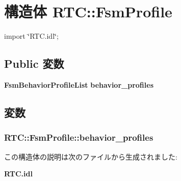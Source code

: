 \section{構造体 RTC::FsmProfile}
\label{structRTC_1_1FsmProfile}


{\ttfamily import \char`\"{}RTC.idl\char`\"{};}

\subsection*{Public 変数}
\begin{DoxyCompactItemize}
\item 
{\bf FsmBehaviorProfileList} {\bf behavior\_\-profiles}
\end{DoxyCompactItemize}


\subsection{変数}
\subsubsection[{behavior\_\-profiles}]{ {\bf RTC::FsmProfile::behavior\_\-profiles}}\label{structRTC_1_1FsmProfile_a3f1aa3d58fcd0beb4ed3ac833487856d}


この構造体の説明は次のファイルから生成されました:\begin{DoxyCompactItemize}
\item 
{\bf RTC.idl}\end{DoxyCompactItemize}
